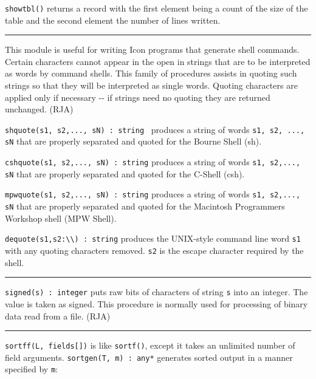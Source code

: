 \texttt{showtbl()} returns a record with the first element being a count
of the size of the table and the second element the number of lines
written. 

\vspace{0.25cm}\hrule{}

This module is useful for writing Icon programs that generate
shell commands. Certain characters cannot appear
in the open in strings that are to be interpreted as
{\textquotedbl}words{\textquotedbl} by command shells. This family of
procedures assists in quoting such strings so that they will be
interpreted as single words. Quoting characters are applied only if
necessary -{}- if strings need no quoting they are returned unchanged.
(RJA)

\texttt{shquote(s1, s2,..., sN) : string} \ produces a string of words
\texttt{s1, s2, ..., sN} that are properly separated and quoted for the
Bourne Shell (sh).

\texttt{cshquote(s1, s2,..., sN) : string} produces a string of words
\texttt{s1, s2,..., sN} that are properly separated and quoted for the
C-Shell (csh).

\texttt{mpwquote(s1, s2,..., sN) : string} produces a string of words
\texttt{s1, s2,..., sN} that are properly separated and quoted for the
Macintosh Programmer{\textquotesingle}s Workshop shell (MPW Shell).

\texttt{dequote(s1,s2:{\textquotedbl}{\textbackslash}{\textbackslash}{\textquotedbl})
: string} produces the UNIX-style command line word \texttt{s1} with
any quoting characters removed. \texttt{s2} is the escape character
required by the shell.

\vspace{0.25cm}\hrule{}

\texttt{signed(s) : integer} puts raw bits of characters of string
\texttt{s} into an integer. The value is taken as signed. This
procedure is normally used for processing of binary data read from a
file. (RJA)

\vspace{0.25cm}\hrule{}

\texttt{sort}\texttt{ff(L, fields[])} is like
\texttt{sortf()}, except it takes an unlimited number of field arguments. \texttt{sortgen(T, m) : any*} generates sorted
output in a manner specified by \texttt{m}:

